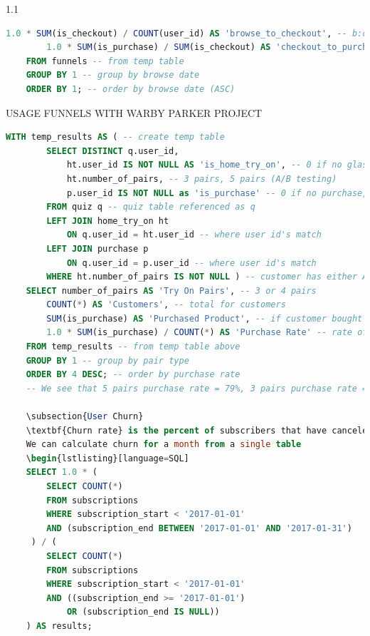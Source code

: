 \documentclass[11pt, a4paper]{article}
\begin{document}
\begin{spacing}{1.1}
\begin{lstlisting}[language=SQL]
		1.0 * SUM(is_checkout) / COUNT(user_id) AS 'browse_to_checkout', -- b:c ratio
		1.0 * SUM(is_purchase) / SUM(is_checkout) AS 'checkout_to_purchase' -- c:p ratio
	FROM funnels -- from temp table
	GROUP BY 1 -- group by browse date
	ORDER BY 1; -- order by browse date (ASC) \end{lstlisting} \newpage
	\noindent USAGE FUNNELS WITH WARBY PARKER PROJECT 
	\begin{lstlisting}[language=SQL]
	WITH temp_results AS ( -- create temp table
		SELECT DISTINCT q.user_id, 
			ht.user_id IS NOT NULL AS 'is_home_try_on', -- 0 if no glasses, 1 if has glasses
			ht.number_of_pairs, -- 3 pairs, 5 pairs (A/B testing)
			p.user_id IS NOT NULL as 'is_purchase' -- 0 if no purchase, 1 if purchase
		FROM quiz q -- quiz table referenced as q
		LEFT JOIN home_try_on ht 
			ON q.user_id = ht.user_id -- where user id's match
		LEFT JOIN purchase p
			ON q.user_id = p.user_id -- where user id's match
		WHERE ht.number_of_pairs IS NOT NULL ) -- customer has either A/B test
	SELECT number_of_pairs AS 'Try On Pairs', -- 3 or 4 pairs 
		COUNT(*) AS 'Customers', -- total for customers
		SUM(is_purchase) AS 'Purchased Product', -- if customer bought product
		1.0 * SUM(is_purchase) / COUNT(*) AS 'Purchase Rate' -- rate of purchase
	FROM temp_results -- from temp table above
	GROUP BY 1 -- group by pair type
	ORDER BY 4 DESC; -- order by purchase rate 
	-- We see that 5 pairs purchase rate = 79%, 3 pairs purchase rate = 53% \end{lstlisting}\vspace*{4mm}
	
	\subsection{User Churn}
	\textbf{Churn rate} is the percent of subscribers that have canceled within a certain period, usually a month. For a user base to grow, the churn rate must be less than the new subscriber rate for the same period and is calculated by $\frac{cancellations}{total\;subscribers}$.\\~\\
	We can calculate churn for a month from a single table 
	\begin{lstlisting}[language=SQL]
	SELECT 1.0 * (
		SELECT COUNT(*)
		FROM subscriptions
		WHERE subscription_start < '2017-01-01' 
		AND (subscription_end BETWEEN '2017-01-01' AND '2017-01-31')
	 ) / (
		SELECT COUNT(*)
		FROM subscriptions
		WHERE subscription_start < '2017-01-01'
		AND ((subscription_end >= '2017-01-01') 
			OR (subscription_end IS NULL))
	) AS results; \end{lstlisting}\newpage
	

\end{spacing}
\end{document}
